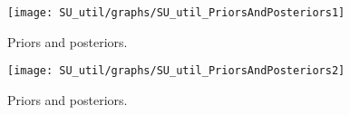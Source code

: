  
\begin{figure}[H]
\centering
\texttt{[image: SU\_util/graphs/SU\_util\_PriorsAndPosteriors1]}
\caption{Priors and posteriors.}\label{Fig:PriorsAndPosteriors:1}
\end{figure}
 
\begin{figure}[H]
\centering
\texttt{[image: SU\_util/graphs/SU\_util\_PriorsAndPosteriors2]}
\caption{Priors and posteriors.}\label{Fig:PriorsAndPosteriors:2}
\end{figure}
 
